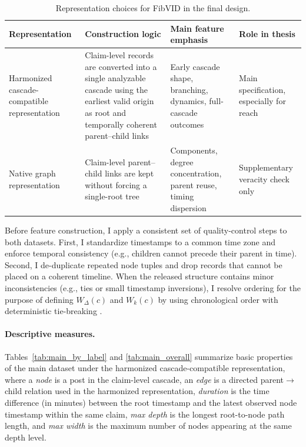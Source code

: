 \begin{table}[htbp]
  \centering
  \caption{Representation choices for FibVID in the final design.}
  \label{tab:representation_overview}
  \begin{tabular}{p{3.1cm}p{4.2cm}p{3.9cm}p{3.2cm}}
    \toprule
    Representation & Construction logic & Main feature emphasis & Role in thesis \\
    \midrule
    Harmonized cascade-compatible representation & Claim-level records are converted into a single analyzable cascade using the earliest valid origin as root and temporally coherent parent--child links & Early cascade shape, branching, dynamics, full-cascade outcomes & Main specification, especially for reach \\
    Native graph representation & Claim-level parent--child links are kept without forcing a single-root tree & Components, degree concentration, parent reuse, timing dispersion & Supplementary veracity check only \\
    \bottomrule
  \end{tabular}
\end{table}

Before feature construction, I apply a consistent set of quality-control steps to both datasets. First, I standardize timestamps to a common time zone and enforce temporal consistency (e.g., children cannot precede their parent in time). Second, I de-duplicate repeated node tuples and drop records that cannot be placed on a coherent timeline. When the released structure contains minor inconsistencies (e.g., ties or small timestamp inversions), I resolve ordering for the purpose of defining $W_{\Delta}(c)$ and $W_k(c)$ by using chronological order with deterministic tie-breaking \citep{choi_dynamicgcn_2021}.

\paragraph{Descriptive measures.}
Tables~\ref{tab:main_by_label} and \ref{tab:main_overall} summarize basic properties of the main dataset under the harmonized cascade-compatible representation, where a \emph{node} is a post in the claim-level cascade, an \emph{edge} is a directed parent$\rightarrow$child relation used in the harmonized representation, \emph{duration} is the time difference (in minutes) between the root timestamp and the latest observed node timestamp within the same claim, \emph{max depth} is the longest root-to-node path length, and \emph{max width} is the maximum number of nodes appearing at the same depth level.

